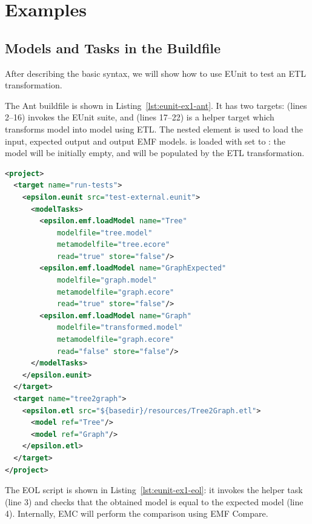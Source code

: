 \section{Examples}
\label{sec:eunit-examples}

\subsection{Models and Tasks in the Buildfile}
\label{sec:eunit-exampl-balanc-ant}

After describing the basic syntax, we will show how to use EUnit to test an ETL transformation.

The Ant buildfile is shown in Listing~\ref{lst:eunit-ex1-ant}. It has two targets:  (lines 2--16) invokes the EUnit suite, and  (lines 17--22) is a helper target which transforms model  into model  using ETL. The  nested element is used to load the input, expected output and output EMF models.  is loaded with  set to : the model will be initially empty, and will be populated by the ETL transformation.

\begin{lstlisting}[float=tbp, language=XML, caption=Ant buildfile for EUnit with \xmlelement{modelTasks} and a helper target, label=lst:eunit-ex1-ant]
<project>
  <target name="run-tests">
    <epsilon.eunit src="test-external.eunit">
      <modelTasks>
        <epsilon.emf.loadModel name="Tree"
            modelfile="tree.model"
            metamodelfile="tree.ecore"
            read="true" store="false"/>
        <epsilon.emf.loadModel name="GraphExpected"
            modelfile="graph.model"
            metamodelfile="graph.ecore"
            read="true" store="false"/>
        <epsilon.emf.loadModel name="Graph"
            modelfile="transformed.model"
            metamodelfile="graph.ecore"
            read="false" store="false"/>
      </modelTasks>
    </epsilon.eunit>
  </target>
  <target name="tree2graph">
    <epsilon.etl src="${basedir}/resources/Tree2Graph.etl">
      <model ref="Tree"/>
      <model ref="Graph"/>
    </epsilon.etl>
  </target>
</project>
\end{lstlisting}

The EOL script is shown in Listing~\ref{lst:eunit-ex1-eol}: it invokes the helper task (line 3) and checks that the obtained model is equal to the expected model (line 4). Internally, EMC will perform the comparison using EMF Compare.

